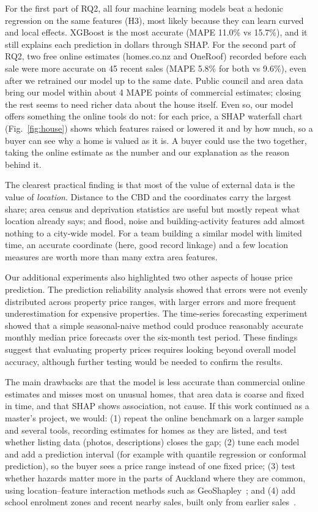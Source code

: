 \documentclass[conference]{IEEEtran}
\begin{document}
For the first part of RQ2, all four machine learning models beat a
hedonic regression on the same features (H3), most likely because they
can learn curved and local effects. XGBoost is the most accurate (MAPE
11.0\% vs 15.7\%), and it still explains each prediction in dollars
through SHAP. For the second part of RQ2, two free online estimates
(homes.co.nz and OneRoof) recorded before each sale were more accurate
on 45 recent sales (MAPE 5.8\% for both vs 9.6\%), even after we
retrained our model up to the same date. Public council and area data
bring our model within about 4 MAPE points of commercial estimates;
closing the rest seems to need richer data about the house itself.
Even so, our model offers something the online tools do not: for each
price, a SHAP waterfall chart (Fig.~\ref{fig:house}) shows which features
raised or lowered it and by how much, so a buyer can see why a home is
valued as it is. A buyer could use the two together, taking the online
estimate as the number and our explanation as the reason behind it.

The clearest practical finding is that most of the value of external
data is the value of \emph{location}. Distance to the CBD and the
coordinates carry the largest share; area census and deprivation
statistics are useful but mostly repeat what location already says; and
flood, noise and building-activity features add almost nothing to a
city-wide model. For a team building a similar model with limited time,
an accurate coordinate (here, good record linkage) and a few location
measures are worth more than many extra area features.

Our additional experiments also highlighted two other aspects of house
price prediction. The prediction reliability analysis showed that errors
were not evenly distributed across property price ranges, with larger
errors and more frequent underestimation for expensive properties. The
time-series forecasting experiment showed that a simple seasonal-naive
method could produce reasonably accurate monthly median price forecasts
over the six-month test period. These findings suggest that evaluating
property prices requires looking beyond overall model accuracy, although
further testing would be needed to confirm the results.

The main drawbacks are that the model is less accurate than commercial
online estimates and misses most on unusual homes, that area
data is coarse and fixed in time, and that SHAP shows association, not
cause. If this work continued as a master's project, we
would: (1) repeat the online benchmark on a larger sample and several
tools, recording estimates for homes as they are listed, and test
whether listing data (photos, descriptions) closes the gap; (2) tune
each model and add a prediction interval (for example with quantile regression or
conformal prediction), so the buyer sees a price range instead of one
fixed price;
(3) test whether hazards matter more in the parts of Auckland where they
are common, using location--feature interaction methods such as
GeoShapley~\cite{li2024geoshapley}; and (4) add school enrolment zones
and recent nearby sales, built only from earlier
sales~\cite{soltani2022}.
\end{document}
